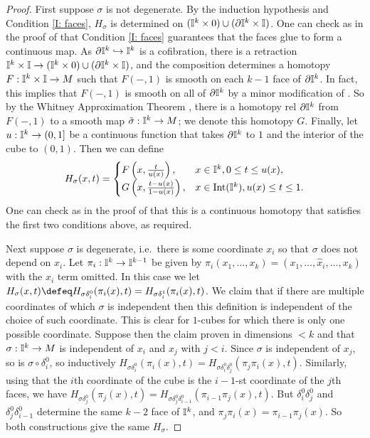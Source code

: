 \begin{proof}
First suppose $\sigma$ is not degenerate. By the induction hypothesis and Condition \eqref{I: faces}, $H_\sigma$ is determined on $(\mathbb{I}^k \times 0) \cup (\partial \mathbb{I}^k \times \mathbb{I})$. One can check as in the proof of \cite[Lemma 18.8]{Lee13} that Condition \eqref{I: faces} guarantees that the faces glue to form a continuous map. As $\partial \mathbb{I}^k \hookrightarrow \mathbb{I}^k$ is a cofibration, there is a retraction $\mathbb{I}^k\times\mathbb{I} \to (\mathbb{I}^k \times 0) \cup (\partial \mathbb{I}^k \times \mathbb{I})$, and the composition determines a homotopy $F:\mathbb{I}^k\times\mathbb{I} \to M$ such that $F(-,1)$ is smooth on each $k-1$ face of $\partial \mathbb{I}^k$. In fact, this implies that $F(-,1)$ is smooth on all of $\partial \mathbb{I}^k$ by a minor modification of \cite[Lemma 18.9]{Lee13}. So by the Whitney Approximation Theorem \cite[Theorem 6.26]{Lee13}, there is a homotopy rel $\partial \mathbb{I}^k$ from $F(-,1)$ to a smooth map $\tilde \sigma:\mathbb{I}^k \to M$; we denote this homotopy $G$. Finally, let $u:\mathbb{I}^k \to (0,1]$ be a continuous function that takes $\partial\mathbb{I}^k$ to $1$ and the interior of the cube to $(0,1)$. Then we can define
\begin{equation*}
H_\sigma(x,t) =
\begin{cases}
F\left(x,\frac{t}{u(x)}\right),&x \in \mathbb{I}^k, 0\leq t\leq u(x),\\
G\left(x,\frac{t-u(x)}{1-u(x)}\right),&x \in \text{Int}(\mathbb{I}^k), u(x)\leq t\leq 1.\\
\end{cases}
\end{equation*}
One can check as in the proof of \cite[Lemma 18.8]{Lee13} that this is a continuous homotopy that satisfies the first two conditions above, as required.

Next suppose $\sigma$ is degenerate, i.e.\ there is some coordinate $x_i$ so that $\sigma$ does not depend on $x_i$. Let $\pi_i:\mathbb{I}^k\to\mathbb{I}^{k-1}$ be given by $\pi_i(x_1,\ldots, x_k) = (x_1,\ldots, \hat x_i, \ldots, x_k)$ with the $x_i$ term omitted. In this case we let $H_\sigma(x,t) \defeq H_{\sigma \delta_i^0}(\pi_i(x),t) = H_{\sigma \delta_i^1}(\pi_i(x),t)$.
 We claim that if there are multiple coordinates of which $\sigma$ is independent then this definition is independent of the choice of such coordinate. This is clear for $1$-cubes for which there is only one possible coordinate. Suppose then the claim proven in dimensions $<k$ and that $\sigma:\mathbb{I}^k \to M$ is independent of $x_i$ and $x_j$ with $j<i$. Since $\sigma$ is independent of $x_j$, so is $\sigma \circ \delta_i^0$, so inductively $H_{\sigma \delta_i^0}(\pi_i(x),t) = H_{\sigma \delta_i^0\delta_j^0}(\pi_j\pi_i(x),t)$. Similarly, using that the $i$th coordinate of the cube is the $i-1$-st coordinate of the $j$th faces, we have $H_{\sigma \delta_j^0}(\pi_j(x),t) = H_{\sigma \delta_j^0\delta_{i-1}^0}(\pi_{i-1}\pi_j(x),t)$. But $\delta_i^0\delta_j^0$ and $\delta_j^0\delta_{i-1}^0$ determine the same $k-2$ face of $\mathbb{I}^k$, and $\pi_j\pi_i(x) = \pi_{i-1}\pi_j(x)$. So both constructions give the same $H_\sigma$.


\end{proof}
